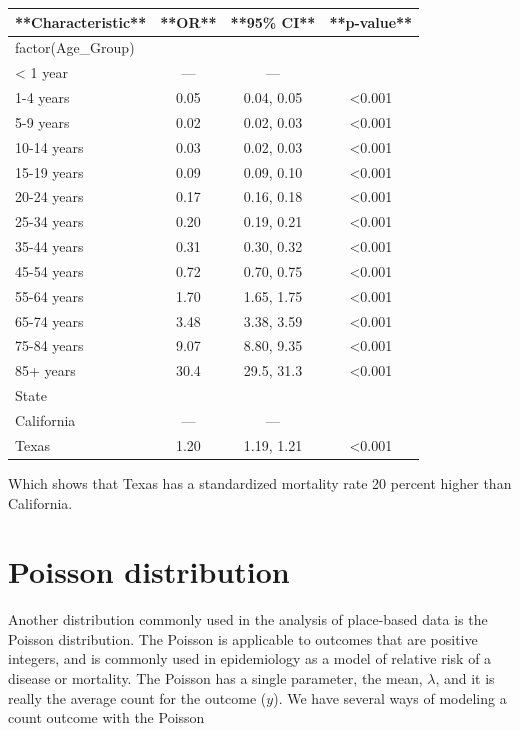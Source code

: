 \documentclass[
  letterpaper,
  DIV=11,
  numbers=noendperiod]{scrreprt}
\begin{document}
\begin{tabular}{l|c|c|c}
\hline
**Characteristic** & **OR** & **95\% CI** & **p-value**\\
\hline
factor(Age\_Group) &  &  & \\
\hline
< 1 year & — & — & \\
\hline
1-4 years & 0.05 & 0.04, 0.05 & <0.001\\
\hline
5-9 years & 0.02 & 0.02, 0.03 & <0.001\\
\hline
10-14 years & 0.03 & 0.02, 0.03 & <0.001\\
\hline
15-19 years & 0.09 & 0.09, 0.10 & <0.001\\
\hline
20-24 years & 0.17 & 0.16, 0.18 & <0.001\\
\hline
25-34 years & 0.20 & 0.19, 0.21 & <0.001\\
\hline
35-44 years & 0.31 & 0.30, 0.32 & <0.001\\
\hline
45-54 years & 0.72 & 0.70, 0.75 & <0.001\\
\hline
55-64 years & 1.70 & 1.65, 1.75 & <0.001\\
\hline
65-74 years & 3.48 & 3.38, 3.59 & <0.001\\
\hline
75-84 years & 9.07 & 8.80, 9.35 & <0.001\\
\hline
85+ years & 30.4 & 29.5, 31.3 & <0.001\\
\hline
State &  &  & \\
\hline
California & — & — & \\
\hline
Texas & 1.20 & 1.19, 1.21 & <0.001\\
\hline
\end{tabular}

Which shows that Texas has a standardized mortality rate 20 percent
higher than California.

\hypertarget{poisson-distribution}{%
\section{Poisson distribution}\label{poisson-distribution}}

Another distribution commonly used in the analysis of place-based data
is the Poisson distribution. The Poisson is applicable to outcomes that
are positive integers, and is commonly used in epidemiology as a model
of relative risk of a disease or mortality. The Poisson has a single
parameter, the mean, \(\lambda\), and it is really the average count for
the outcome (\(y\)). We have several ways of modeling a count outcome
with the Poisson
\end{document}
